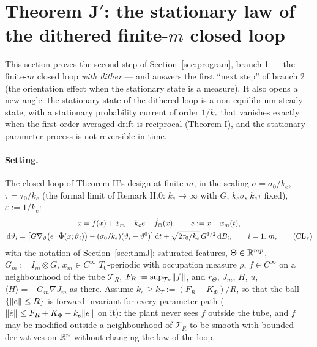 \section{Theorem J\texorpdfstring{$'$}{'}: the stationary law of the dithered finite-\texorpdfstring{$m$}{m} closed
loop}\label{sec:thmJprime}

This section proves the second step of Section~\ref{sec:program}, branch 1 --- the finite-$m$ closed loop \emph{with
dither} --- and answers the first ``next step'' of branch 2 (the orientation effect when the stationary state is a
measure). It also opens a new angle: the stationary state of the dithered loop is a non-equilibrium steady state, with
a stationary probability current of order $1/k_e$ that vanishes exactly when the first-order averaged drift is
reciprocal (Theorem I), and the stationary parameter process is not reversible in time.

\paragraph{Setting.} The closed loop of Theorem H's design at finite $m$, in the scaling $\sigma = \sigma_0/k_e$,
$\tau = \tau_0/k_e$ (the formal limit of Remark H.0: $k_e\to\infty$ with $G$, $k_e\sigma$, $k_e\tau$ fixed),
$\varepsilon := 1/k_e$:
\begin{gather}
  \dot x = f(x) + \dot x_m - k_ee - \hat f_\Theta(x),\qquad e := x - x_m(t),\notag\\
  \,\mathrm{d}\vartheta_i = \bigl[G\nabla_\vartheta\bigl(e^\top\tilde\Phi(x;\vartheta_i)\bigr)
  - (\sigma_0/k_e)(\vartheta_i - \vartheta^0)\bigr]\,\mathrm{d} t + \sqrt{2\tau_0/k_e}\,G^{1/2}\,\mathrm{d} B_i,\qquad i = 1..m,
  \tag{CL$_\tau$}
\end{gather}
with the notation of Section~\ref{sec:thmJ}: saturated features, $\Theta\in\mathbb{R}^{mp}$, $G_m := I_m\otimes G$,
$x_m\in C^\infty$ $T_0$-periodic with occupation measure $\rho$, $f\in C^\infty$ on a neighbourhood of the tube
$\mathcal T_R$, $F_R := \sup_{\mathcal T_R}\lVert f\rVert$, and $r_\Theta$, $J_m$, $H$, $u$,
$\langle H\rangle = -G_m\nabla J_m$ as there. Assume $k_e\ge k_T := (F_R + K_\Phi)/R$, so that the ball
$\{\lVert e\rVert\le R\}$ is forward invariant for every parameter path ($\lVert \dot e\rVert\le F_R + K_\Phi - k_e\lVert e\rVert$ on
it): the plant never sees $f$ outside the tube, and $f$ may be modified outside a neighbourhood of $\mathcal T_R$ to
be smooth with bounded derivatives on $\mathbb{R}^n$ without changing the law of the loop.

